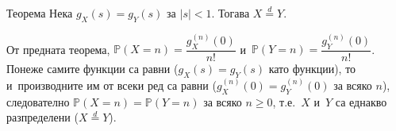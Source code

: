 \begin{thmbox}[]{Теорема}
Нека $g_X(s)=g_Y(s)$ за $|s|<1$. Тогава $X\stackrel{d}{=}Y$.
\end{thmbox}

\begin{proofbox}
От предната теорема, $\mathbb P(X=n)=\dfrac{g_X^{(n)}(0)}{n!}$ и~$\mathbb P(Y=n)=\dfrac{g_Y^{(n)}(0)}{n!}$. Понеже самите функции са
равни ($g_X(s)=g_Y(s)$ като функции), то и~производните им от всеки
ред са равни ($g_X^{(n)}(0)=g_Y^{(n)}(0)$ за всяко $n$), следователно
$\mathbb P(X=n)=\mathbb P(Y=n)$ за всяко $n\ge0$, т.е.\ $X$ и~$Y$ са
еднакво разпределени ($X\stackrel{d}{=}Y$). \qedbg
\end{proofbox}
